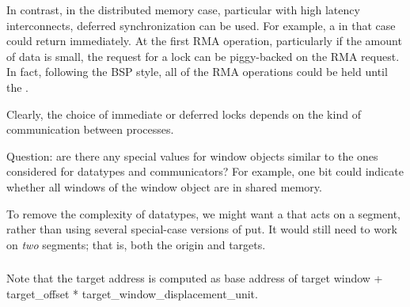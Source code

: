 \documentclass{article}
\begin{document}
In contrast, in the distributed memory case, particular with high
latency interconnects, deferred synchronization can be used.  For
example, a  in that case could return immediately.
At the first RMA operation, particularly if the amount of data is
small, the request for a lock can be piggy-backed on the RMA request.
In fact, following the BSP style, all of the RMA operations could be
held until the .

Clearly, the choice of immediate or deferred locks depends on the kind
of communication between processes.

Question: are there any special values for window objects similar to the ones
considered for datatypes and communicators?  For example, one bit could
indicate whether all windows of the window object are in shared memory.

To remove the complexity of datatypes, we might want a
 that acts on a segment, rather than using several
special-case versions of put.  It would still need to work on \emph{two}
segments; that is, both the origin and targets.

\subsubsection{}

Note that the target address is computed as base address of target window +
target_offset * target_window_displacement_unit.
\end{document}
